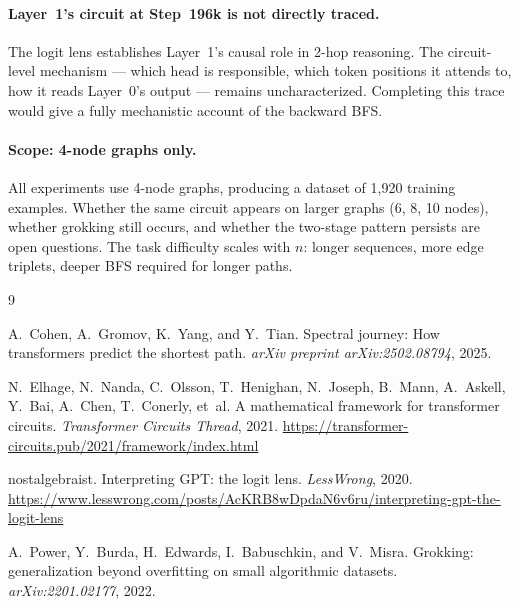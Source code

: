 \documentclass[11pt, a4paper]{article}
\begin{document}
\paragraph{Layer~1's circuit at Step~196k is not directly traced.}
The logit lens establishes Layer~1's causal role in 2-hop reasoning.
The circuit-level mechanism --- which head is responsible, which token
positions it attends to, how it reads Layer~0's output --- remains
uncharacterized.  Completing this trace would give a fully mechanistic
account of the backward BFS.

\paragraph{Scope: 4-node graphs only.}
All experiments use 4-node graphs, producing a dataset of 1{,}920
training examples.  Whether the same circuit appears on larger graphs
(6, 8, 10 nodes), whether grokking still occurs, and whether the
two-stage pattern persists are open questions.  The task difficulty
scales with $n$: longer sequences, more edge triplets, deeper BFS
required for longer paths.

\begin{thebibliography}{9}

A.~Cohen, A.~Gromov, K.~Yang, and Y.~Tian.
\newblock Spectral journey: How transformers predict the shortest path.
\newblock \emph{arXiv preprint arXiv:2502.08794}, 2025.

N.~Elhage, N.~Nanda, C.~Olsson, T.~Henighan, N.~Joseph, B.~Mann,
A.~Askell, Y.~Bai, A.~Chen, T.~Conerly, et~al.
\newblock A mathematical framework for transformer circuits.
\newblock \emph{Transformer Circuits Thread}, 2021.
\newblock \url{https://transformer-circuits.pub/2021/framework/index.html}

nostalgebraist.
\newblock Interpreting GPT: the logit lens.
\newblock \emph{LessWrong}, 2020.
\newblock \url{https://www.lesswrong.com/posts/AcKRB8wDpdaN6v6ru/interpreting-gpt-the-logit-lens}

A.~Power, Y.~Burda, H.~Edwards, I.~Babuschkin, and V.~Misra.
\newblock Grokking: generalization beyond overfitting on small algorithmic
  datasets.
\newblock \emph{arXiv:2201.02177}, 2022.

\end{thebibliography}
\end{document}
